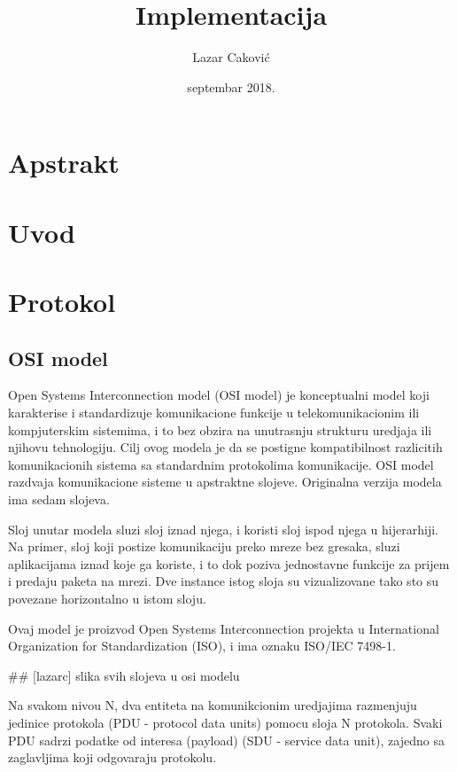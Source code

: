 \documentclass[a4paper,12pt, master]{etf}
\title{Implementacija}
\author{Lazar Caković}
\date{septembar 2018.}
\begin{document}
	\maketitle

	\tableofcontents

	\listoffigures

	\newpage

	\chapter{Apstrakt}

	\newpage

	\chapter{Uvod}

	\newpage

	\chapter{Protokol}

	\section{OSI model}

	Open Systems Interconnection model (OSI model) je konceptualni model koji karakterise i
	standardizuje komunikacione funkcije u telekomunikacionim ili kompjuterskim sistemima, i to bez
	obzira na unutrasnju strukturu uredjaja ili njihovu tehnologiju. Cilj ovog modela je da se
	postigne kompatibilnost razlicitih komunikacionih sistema sa standardnim protokolima
	komunikacije. OSI model razdvaja komunikacione sisteme u apstraktne slojeve. Originalna verzija
	modela ima sedam slojeva.

	Sloj unutar modela sluzi sloj iznad njega, i koristi sloj ispod njega u hijerarhiji. Na primer,
	sloj koji postize komunikaciju preko mreze bez gresaka, sluzi aplikacijama iznad koje ga
	koriste, i to dok poziva jednostavne funkcije za prijem i predaju paketa na mrezi. Dve instance
	istog sloja su vizualizovane tako sto su povezane horizontalno u istom sloju.

	Ovaj model je proizvod Open Systems Interconnection projekta u International Organization for
	Standardization (ISO), i ima oznaku ISO/IEC 7498-1.

	\#\# [lazarc] slika svih slojeva u osi modelu

	Na svakom nivou N, dva entiteta na komunikcionim uredjajima razmenjuju jedinice protokola (PDU
	- protocol data units) pomocu sloja N protokola. Svaki PDU sadrzi podatke od interesa (payload)
	(SDU - service data unit), zajedno sa zaglavljima koji odgovaraju protokolu.
\end{document}
